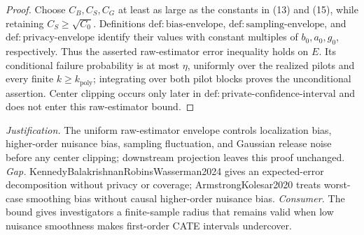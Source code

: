 \documentclass{article}
\begin{document}
\begin{proof}
Choose \(C_B,C_S,C_G\) at least as large as the constants in (13) and (15), while retaining \(C_S\ge\sqrt{C_0}\).  Definitions \(\mathrm{def{:}bias\text{-}envelope}\), \(\mathrm{def{:}sampling\text{-}envelope}\), and \(\mathrm{def{:}privacy\text{-}envelope}\) identify their values with constant multiples of \(b_0,a_0,g_0\), respectively.  Thus the asserted raw-estimator error inequality holds on \(E\).  Its conditional failure probability is at most \(\eta\), uniformly over the realized pilots and every finite \(k\ge k_{\mathrm{poly}}\); integrating over both pilot blocks proves the unconditional assertion.  Center clipping occurs only later in \(\mathrm{def{:}private\text{-}confidence\text{-}interval}\) and does not enter this raw-estimator bound.
\end{proof}
\par\smallskip\noindent \textit{Justification.} The uniform raw-estimator envelope controls localization bias, higher-order nuisance bias, sampling fluctuation, and Gaussian release noise before any center clipping; downstream projection leaves this proof unchanged. \textit{Gap.} KennedyBalakrishnanRobinsWasserman2024 gives an expected-error decomposition without privacy or coverage; ArmstrongKolesar2020 treats worst-case smoothing bias without causal higher-order nuisance bias. \textit{Consumer.} The bound gives investigators a finite-sample radius that remains valid when low nuisance smoothness makes first-order CATE intervals undercover.
\end{document}
